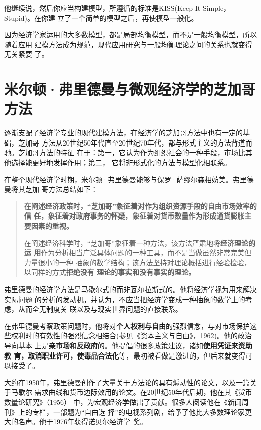 他继续说，然后你应当构建模型，所遵循的标准是KISS(Keep It Simple，Stupid)。在你建
立了一个简单的模型之后，再使模型一般化。


因为经济学家运用的大多数模型，都是局部均衡模型，而不是一般均衡模型，所以随着应用
建模方法成为规范，现代应用研究与一般均衡理论之间的关系也就变得无关紧要
了。

\section{米尔顿·弗里德曼与微观经济学的芝加哥方法}

逐渐支配了经济学专业的现代建模方法，在经济学的芝加哥方法中也有一定的基础，芝加哥
方法从20世纪50年代直至20世纪70年代，都与形式主义的方法背道而驰。芝加哥方法的特征
在于：第一，它认为作为组织社会的一种手段，市场比其他选择能更好地发挥作用；第二，
它将非形式化的方法与模型化相联系。

在整个现代经济学时期，米尔顿·弗里德曼能够与保罗·萨缪尔森相妨美。弗里德曼将其芝加
哥方法总结如下：

\begin{quotation}
  \textbf{在阐述经济政策时，“芝加哥”象征着对作为组织资源手段的自由市场效率的信
    任，象征着对政府事务的怀疑，象征着对货币数量作为形成通货膨胀主要因素的重视。}

  在阐述经济科学时，“芝加哥”象征着一种方法，该方法严肃地将\textbf{经济理论的运
    用}作为分析相当广泛具体问题的一种工具，而不是当做虽然非常完美但力量很小的一种
  抽象的数学结构；该方法坚持对理论概括进行经验检验，以同样的方式\textbf{拒绝没有
    理论的事实和没有事实的理论。}
\end{quotation}

弗里德曼的经济学方法是马歇尔式的而非瓦尔拉斯式的。他将经济学视为用来解决实际问题
的分析的发动机，并认为，不应当把经济学变成一种抽象的数学上的考虑，从而全无制度关
联以及与现实世界问题的直接联系。

在弗里德曼考察政策问题时，他将对\textbf{个人权利与自由}的强烈信念，与对市场保护这
些权利时的有效性的强烈信念相结合(参见《资本主义与自由》，1962)。他的政治导向基本
上是\textbf{亲市场和反政府}的。他提倡的很多政策建议，诸如\textbf{使用凭证来资助教
  育，取消职业许可，使毒品合法化}等，最初被看做是激进的，但后来就变得可以接受了。

大约在1950年，弗里德曼创作了大量关于方法论的具有煽动性的论文，以及一篇关于马歇尔
需求曲线和货币边际效用的论文。在20世纪50年代后期，他在其《货币数量论研究》（1956）
中，为宏观经济学做出了贡献。很多人阅读他在《新闻周刊》上的专栏，一部题为“自由选
择”的电视系列剧，给予了他比大多数理论家更大的名声。他于1976年获得诺贝尔经济学
奖。

